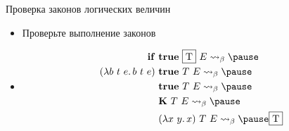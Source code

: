     \begin{frame}[fragile]{Проверка законов логических величин}
        \begin{itemize}
            \item[\todo] Проверьте выполнение законов
            \item[\answer] \pause
            \begin{align*}
                \term{if} \ap &\term{true} \ap \framebox{T} \ap E
                \step_{\beta} \pause \\
                (\lambda b~t~e\ldotp b \ap t \ap e) \ap &\term{true} \ap T \ap E
                \step_{\beta} \pause \\
                &\term{true} \ap T \ap E
                \step_{\beta} \pause \\
                &\term{K} \ap T \ap E
                \step_{\beta} \pause \\
                &(\lambda x~y\ldotp x) \ap T \ap E
                \step_{\beta} \pause
                \framebox{T}
            \end{align*}
        \end{itemize}
    \end{frame}

